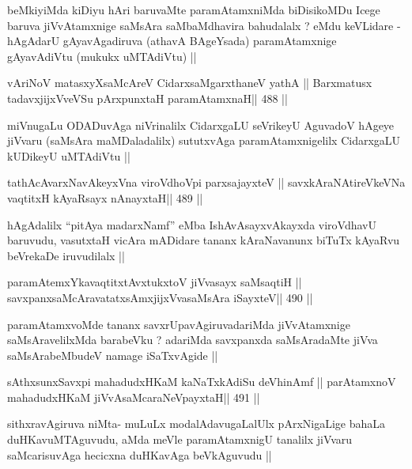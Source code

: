 \begin{artha}
beMkiyiMda kiDiyu hAri baruvaMte paramAtamxniMda biDisikoMDu Icege
baruva jiVvAtamxnige saMsAra saMbaMdhavira bahudalalx ? eMdu keVLidare
- hAgAdarU gAyavAgadiruva (athavA BAgeYsada) paramAtamxnige
gAyavAdiVtu (mukukx uMTAdiVtu) ||
\end{artha}

\begin{shl}
vAriNoV matasxyXsaMcAreV CidarxsaMgarxthaneV yathA ||
Barxmatusx tadavxjijxVveVSu pArxpunxtaH paramAtamxnaH\hfill || 488 ||
\end{shl}

\begin{artha}
miVnugaLu ODADuvAga niVrinalilx CidarxgaLU seVrikeyU AguvadoV hAgeye
jiVvaru (saMsAra maMDaladalilx) sututxvAga paramAtamxnigelilx
CidarxgaLU kUDikeyU uMTAdiVtu ||
\end{artha}

\begin{shl}
tathAcAvarxNavAkeyxVna viroVdhoV\s pi parxsajayxteV ||
savxkAraNAtireVkeVNa vaqtitxH kAyaRsayx nAnayxtaH\hfill || 489 ||
\end{shl}

\begin{artha}
hAgAdalilx ``pitAya madarxNamf'' eMba IshAvAsayxvAkayxda viroVdhavU
baruvudu, vasutxtaH vicAra mADidare tananx kAraNavanunx biTuTx kAyaRvu
beVrekaDe iruvudilalx ||
\end{artha}

\begin{shl}
paramAtemxYkavaqtitxtAvxtukxtoV jiVvasayx saMsaqtiH ||
savxpanxsaMcAravatatxsAmxjijxVvasaMsAra iSayxteV\hfill || 490 ||
\end{shl}

\begin{artha}
paramAtamxvoMde tananx savxrUpavAgiruvadariMda jiVvAtamxnige
saMsAravelilxMda barabeVku ? adariMda savxpanxda saMsAradaMte jiVva
saMsArabeMbudeV namage iSaTxvAgide ||
\end{artha}

\begin{shl}
sAthxsunxSavxpi mahadudxHKaM kaNaTxkAdiSu deVhinAmf ||
parAtamxnoV mahadudxHKaM jiVvAsaMcaraNeV\s payxtaH\hfill || 491 ||
\end{shl}

\begin{artha}
sithxravAgiruva niMta- muLuLx modalAdavugaLalUlx pArxNigaLige bahaLa
duHKavuMTAguvudu, aMda meVle paramAtamxnigU tanalilx jiVvaru
saMcarisuvAga hecicxna duHKavAga beVkAguvudu ||
\end{artha}


